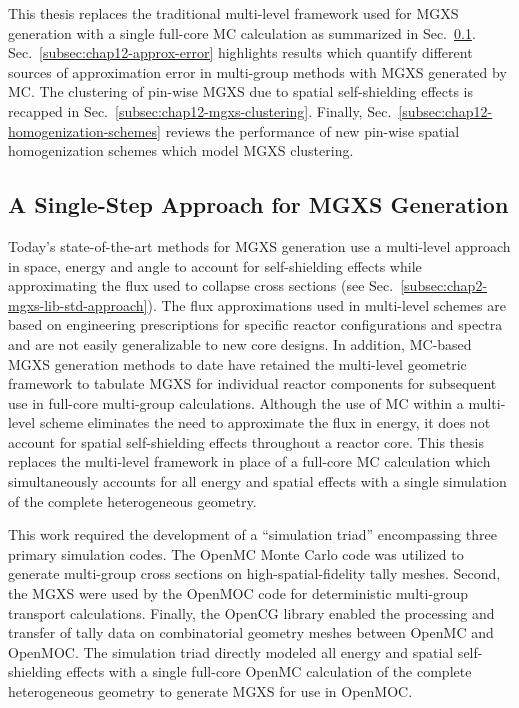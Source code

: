 This thesis replaces the traditional multi-level framework used for \ac{MGXS} generation with a single full-core MC calculation as summarized in Sec.~\ref{subsec:chap12-single-step}. Sec.~\ref{subsec:chap12-approx-error} highlights results which quantify different sources of approximation error in multi-group methods with \ac{MGXS} generated by \ac{MC}. The clustering of pin-wise \ac{MGXS} due to spatial self-shielding effects is recapped in Sec.~\ref{subsec:chap12-mgxs-clustering}. Finally, Sec.~\ref{subsec:chap12-homogenization-schemes} reviews the performance of new pin-wise spatial homogenization schemes which model \ac{MGXS} clustering.

\subsection{A Single-Step Approach for MGXS Generation}
\label{subsec:chap12-single-step}

Today's state-of-the-art methods for \ac{MGXS} generation use a multi-level approach in space, energy and angle to account for self-shielding effects while approximating the flux used to collapse cross sections (see Sec.~\ref{subsec:chap2-mgxs-lib-std-approach}). The flux approximations used in multi-level schemes are based on engineering prescriptions for specific reactor configurations and spectra and are not easily generalizable to new core designs. In addition, \ac{MC}-based \ac{MGXS} generation methods to date have retained the multi-level geometric framework to tabulate MGXS for individual reactor components for subsequent use in full-core multi-group calculations. Although the use of MC within a multi-level scheme eliminates the need to approximate the flux in energy, it does not account for spatial self-shielding effects throughout a reactor core. This thesis replaces the multi-level framework in place of a full-core \ac{MC} calculation which simultaneously accounts for all energy and spatial effects with a single simulation of the complete heterogeneous geometry.

This work required the development of a ``simulation triad'' encompassing three primary simulation codes. The OpenMC Monte Carlo code was utilized to generate multi-group cross sections on high-spatial-fidelity tally meshes. Second, the \ac{MGXS} were used by the OpenMOC code for deterministic multi-group transport calculations. Finally, the OpenCG library enabled the processing and transfer of tally data on combinatorial geometry meshes between OpenMC and OpenMOC. The simulation triad directly modeled all energy and spatial self-shielding effects with a single full-core OpenMC calculation of the complete heterogeneous geometry to generate \ac{MGXS} for use in OpenMOC.

